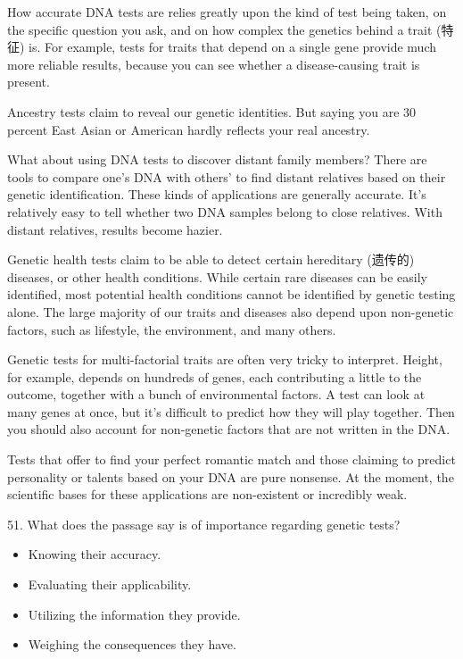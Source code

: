 \documentclass[UTF8,11pt]{ctexart}
\begin{document}
How accurate DNA tests are relies greatly upon the kind of test being taken, on the specific question you ask, and on how complex the genetics behind a trait (特征) is. For example, tests for traits that depend on a single gene provide much more reliable results, because you can see whether a disease-causing trait is present.


Ancestry tests claim to reveal our genetic identities. But saying you are 30 percent East Asian or American hardly reflects your real ancestry.


What about using DNA tests to discover distant family members? There are tools to compare one’s DNA with others’ to find distant relatives based on their genetic identification. These kinds of applications are generally accurate. It’s relatively easy to tell whether two DNA samples belong to close relatives. With distant relatives, results become hazier.


Genetic health tests claim to be able to detect certain hereditary (遗传的) diseases, or other health conditions. While certain rare diseases can be easily identified, most potential health conditions cannot be identified by genetic testing alone. The large majority of our traits and diseases also depend upon non-genetic factors, such as lifestyle, the environment, and many others.


Genetic tests for multi-factorial traits are often very tricky to interpret. Height, for example, depends on hundreds of genes, each contributing a little to the outcome, together with a bunch of environmental factors. A test can look at many genes at once, but it’s difficult to predict how they will play together. Then you should also account for non-genetic factors that are not written in the DNA.


Tests that offer to find your perfect romantic match and those claiming to predict personality or talents based on your DNA are pure nonsense. At the moment, the scientific bases for these applications are non-existent or incredibly weak.


51. What does the passage say is of importance regarding genetic tests?


\begin{itemize}[leftmargin=2em,itemsep=.2em,topsep=.4em]\item[A.] Knowing their accuracy.
\item[B.] Evaluating their applicability.
\item[C.] Utilizing the information they provide.
\item[D.] Weighing the consequences they have.
\end{itemize}
\end{document}
